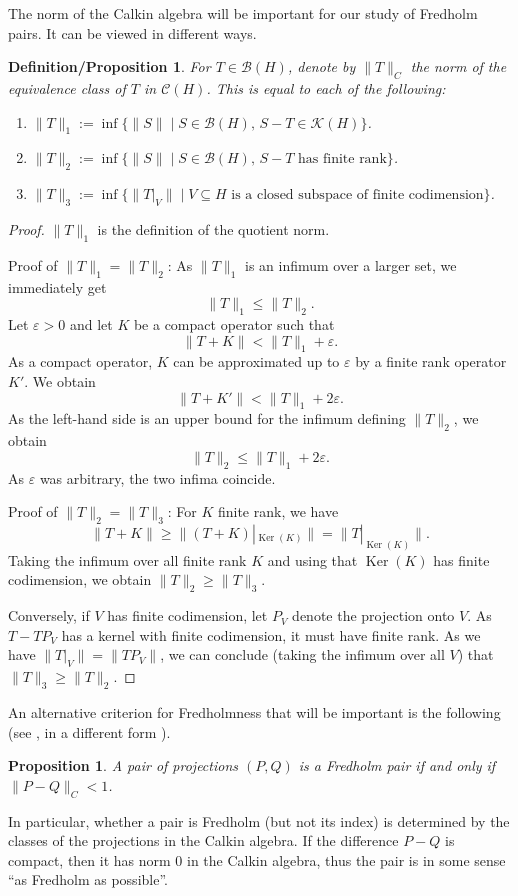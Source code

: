 \documentclass[pdftex]{sigma}
\numberwithin{equation}{section}
\newtheorem{Proposition}[Theorem]{Proposition}
\newtheorem{defprop}[Theorem]{Definition/Proposition}
\DeclareMathOperator{\Ker}{Ker}
\begin{document}
The norm of the Calkin algebra will be important for our study of Fredholm pairs. It can be viewed in different ways.
	\begin{defprop}		\label {cnorm}
		For $T\in\mathcal{B}(H)$, denote by $\|T\|_C$ the norm of the equivalence class of $T$ in $\mathcal{C}(H)$. This is equal to each of the following:
		\begin{enumerate}\itemsep=0pt
			\item[$(1)$] %
            $\|T\|_1:=\inf\{\|S\| \mid S\in\mathcal{B}(H),\, S-T\in\mathcal{K}(H)\}$.
			\item[$(2)$] %
            $\|T\|_2:=\inf\{\|S\| \mid S\in\mathcal{B}(H),\, S-T\text{ has finite rank}\}$.
			\item[$(3)$] %
            $\|T\|_3:=\inf\{\|T|_V\|\mid V\subseteq H \text{ is a closed subspace of finite codimension}\}$.
		\end{enumerate}
	\end{defprop}
	\begin{proof}
		$\|T\|_1$ is the definition of the quotient norm.
		
		Proof of $\|T\|_1=\|T\|_2$:
				As $\|T\|_1$ is an infimum over a larger set, we immediately get
		\[\|T\|_1\leq\|T\|_2.\]
		Let $\varepsilon>0$ and let $K$ be a compact operator such that \[\|T+K\|<\|T\|_1+\varepsilon.\] As a compact operator, $K$ can be approximated up to $\varepsilon$ by a finite rank operator $K'$. We obtain
		\[\bigl\|T+K'\bigr\|<\|T\|_1+2\varepsilon.\]
		As the left-hand side is an upper bound for the infimum defining $\|T\|_2$, we obtain
		\[\|T\|_2\leq \|T\|_1+2\varepsilon.\]
		As $\varepsilon$ was arbitrary, the two infima coincide.
		
		Proof of $\|T\|_2=\|T\|_3$:
For $K$ finite rank, we have
        \[
        \|T+K\|\geq \bigl\|(T+K)|_{\Ker(K)}\bigr\|= \bigl\|T|_{\Ker(K)}\bigr\|.
        \]
        Taking the infimum over all finite rank $K$ and using that $\Ker(K)$ has finite codimension, we obtain $\|T\|_2\geq\|T\|_3$.
		
		Conversely, if $V$ has finite codimension, let $P_V$ denote the projection onto $V$. As $T-TP_V$ has a kernel with finite codimension,  it must have finite rank. As we have $\|T|_V\|=\|TP_V\|$, we can conclude (taking the infimum over all $V$) that  $\|T\|_3\geq\|T\|_2$.
	\end{proof}

	An alternative criterion for Fredholmness that will be important is the following (see \cite[Corollary~5.3.14]{DSW}, in a different form \cite[Proposition~3.2]{ASS}).
	\begin{Proposition}
		\label{FredDiff}
		A pair of projections $(P,Q)$ is a Fredholm pair if and only if
		$\|P-Q\|_C<1$.
	\end{Proposition}
	In particular, whether a pair is Fredholm (but not its index) is determined by the classes of the projections in the Calkin algebra. If the difference $P-Q$ is compact, then it has norm $0$ in the Calkin algebra, thus the pair is in some sense ``as Fredholm as possible''.
\end{document}
